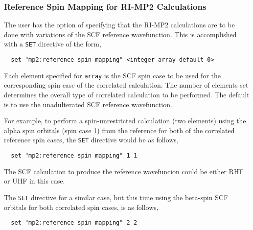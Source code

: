 \subsubsection{Reference Spin Mapping for RI-MP2 Calculations}

The user has the option of specifying that the RI-MP2 calculations 
are to be done with variations of the SCF reference wavefunction.  This
is accomplished with a \verb+SET+ directive of the form,

\begin{verbatim}
  set "mp2:reference spin mapping" <integer array default 0>
\end{verbatim}


Each element specified for \verb+array+ is the SCF spin case to be used
for the corresponding spin case of the correlated calculation.  The
number of elements set determines the overall type of correlated
calculation to be performed.  The default is to use the unadulterated
SCF reference wavefunction.  


For example, to perform a spin-unrestricted calculation (two
elements) using the alpha spin orbitals (spin case 1) from the
reference for both of the correlated reference spin cases, the \verb+SET+
directive would be as follows,

\begin{verbatim}
  set "mp2:reference spin mapping" 1 1
\end{verbatim}

The SCF calculation to produce the reference wavefuncion could be either
RHF or UHF in this case.



The \verb+SET+ directive for a similar case, but this time using
the beta-spin SCF orbitals for both correlated spin cases, is as follows,
\begin{verbatim}
  set "mp2:reference spin mapping" 2 2
\end{verbatim}

